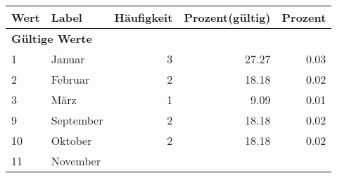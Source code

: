     \begin{longtable}{lXrrr}
     \toprule
     \textbf{Wert} & \textbf{Label} & \textbf{Häufigkeit} & \textbf{Prozent(gültig)} & \textbf{Prozent} \\
     \endhead
     \midrule
     \multicolumn{5}{l}{\textbf{Gültige Werte}}\\

     1 &
     \multicolumn{1}{X}{ Januar   } &


       \num{3} &
       \num[round-mode=places,round-precision=2]{27.27} &
         \num[round-mode=places,round-precision=2]{0.03} \\

     2 &
     \multicolumn{1}{X}{ Februar   } &


       \num{2} &
       \num[round-mode=places,round-precision=2]{18.18} &
         \num[round-mode=places,round-precision=2]{0.02} \\

     3 &
     \multicolumn{1}{X}{ März   } &


       \num{1} &
       \num[round-mode=places,round-precision=2]{9.09} &
         \num[round-mode=places,round-precision=2]{0.01} \\

     9 &
     \multicolumn{1}{X}{ September   } &


       \num{2} &
       \num[round-mode=places,round-precision=2]{18.18} &
         \num[round-mode=places,round-precision=2]{0.02} \\

     10 &
     \multicolumn{1}{X}{ Oktober   } &


       \num{2} &
       \num[round-mode=places,round-precision=2]{18.18} &
         \num[round-mode=places,round-precision=2]{0.02} \\

     11 &
     \multicolumn{1}{X}{ November   } &



\end{longtable}
